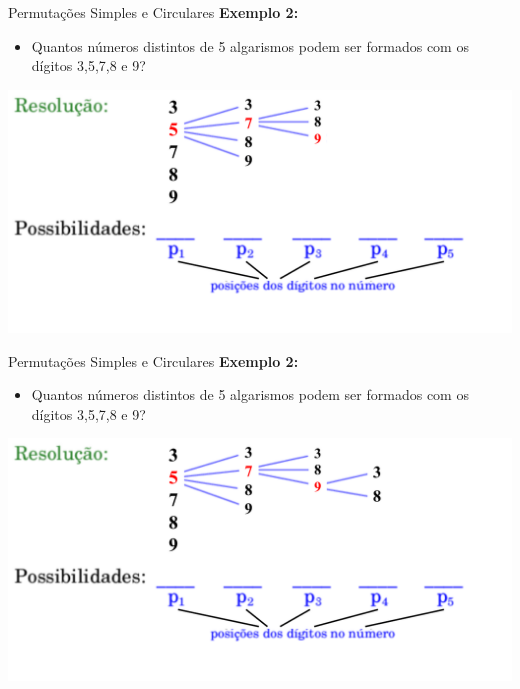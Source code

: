 \documentclass[aspectratio=169]{beamer}
\begin{document}
\begin{frame}{Permutações Simples e Circulares}
    \textbf{Exemplo 2:}

    \vspace{3mm}

    \begin{itemize}
        \item[] Quantos números distintos de 5 algarismos podem ser formados com os dígitos 3,5,7,8 e 9?
    \end{itemize}

    \begin{center}
        \includegraphics[width=0.75\linewidth]{figs/Exemplo2_6.png}
    \end{center}
\end{frame}

\begin{frame}{Permutações Simples e Circulares}
    \textbf{Exemplo 2:}

    \vspace{3mm}

    \begin{itemize}
        \item[] Quantos números distintos de 5 algarismos podem ser formados com os dígitos 3,5,7,8 e 9?
    \end{itemize}

    \begin{center}
        \includegraphics[width=0.75\linewidth]{figs/Exemplo2_7.png}
    \end{center}
\end{frame}
\end{document}
